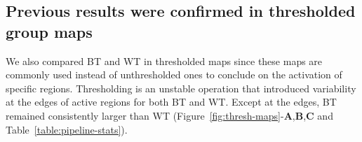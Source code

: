 


\subsection{Previous results were confirmed in thresholded group maps}

We also compared BT and WT in thresholded maps since these maps are commonly used instead of unthresholded ones 
to conclude on the activation of specific regions. Thresholding is an unstable operation
that introduced variability at the edges of
active regions for both BT and WT. Except at the edges, BT remained consistently larger
than WT (Figure~\ref{fig:thresh-maps}-\textbf{A},\textbf{B},\textbf{C} and Table~\ref{table:pipeline-stats}). 


